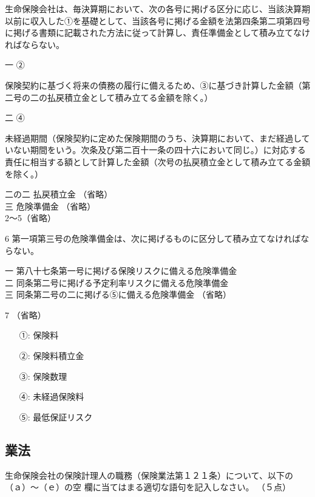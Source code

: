 \documentclass[report,gutter=10mm,fore-edge=10mm,uplatex,dvipdfmx]{jlreq}
\begin{document}
生命保険会社は、毎決算期において、次の各号に掲げる区分に応じ、当該決算期以前に収入した①を基礎として、当該各号に掲げる金額を法第四条第二項第四号に掲げる書類に記載された方法に従って計算し、責任準備金として積み立てなければならない。

一 ②

保険契約に基づく将来の債務の履行に備えるため、③に基づき計算した金額（第二号の二の払戻積立金として積み立てる金額を除く。）

二 ④

未経過期間（保険契約に定めた保険期間のうち、決算期において、まだ経過していない期間をいう。次条及び第二百十一条の四十六において同じ。）に対応する責任に相当する額として計算した金額（次号の払戻積立金として積み立てる金額を除く。）

二の二 払戻積立金 （省略）\\
三 危険準備金 （省略）\\
2〜5（省略）

6 第一項第三号の危険準備金は、次に掲げるものに区分して積み立てなければならない。

一 第八十七条第一号に掲げる保険リスクに備える危険準備金\\
二 同条第二号に掲げる予定利率リスクに備える危険準備金\\
三 同条第二号の二に掲げる⑤に備える危険準備金
（省略）

7 （省略）
\answer{}

\begin{itemize}
\item[ ①:] 保険料
\item[ ②:] 保険料積立金
\item[ ③:] 保険数理
\item[ ④:] 未経過保険料
\item[ ⑤:] 最低保証リスク
\end{itemize}

\subsection{業法}
生命保険会社の保険計理人の職務（保険業法第１２１条）について、以下の（ａ）～（ｅ）の空
欄に当てはまる適切な語句を記入しなさい。
（５点）
\end{document}
